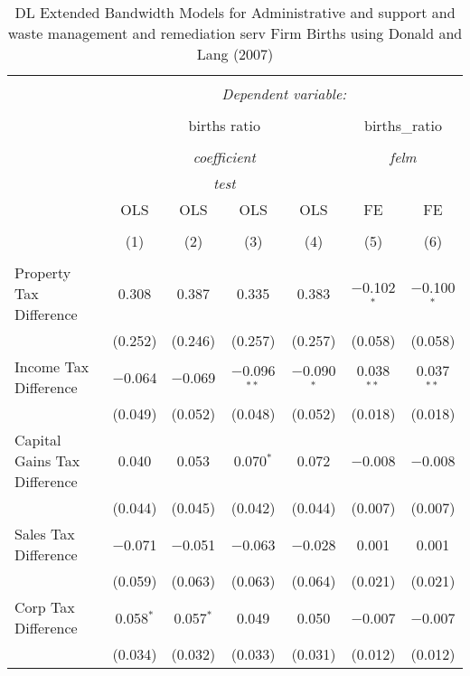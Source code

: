 
\begin{table}[!htbp] \centering 
  \caption{DL Extended Bandwidth Models for  Administrative and support and waste management and remediation serv Firm Births using Donald and Lang (2007)} 
  \label{} 
\begin{tabular}{@{\extracolsep{5pt}}lcccccc} 
\\[-1.8ex]\hline 
\hline \\[-1.8ex] 
 & \multicolumn{6}{c}{\textit{Dependent variable:}} \\ 
\cline{2-7} 
\\[-1.8ex] & \multicolumn{4}{c}{births ratio} & \multicolumn{2}{c}{births\_ratio} \\ 
\\[-1.8ex] & \multicolumn{4}{c}{\textit{coefficient}} & \multicolumn{2}{c}{\textit{felm}} \\ 
 & \multicolumn{4}{c}{\textit{test}} & \multicolumn{2}{c}{\textit{}} \\ 
 & OLS & OLS & OLS & OLS & FE & FE \\ 
\\[-1.8ex] & (1) & (2) & (3) & (4) & (5) & (6)\\ 
\hline \\[-1.8ex] 
 Property Tax Difference & 0.308 & 0.387 & 0.335 & 0.383 & $-$0.102$^{*}$ & $-$0.100$^{*}$ \\ 
  & (0.252) & (0.246) & (0.257) & (0.257) & (0.058) & (0.058) \\ 
  Income Tax Difference & $-$0.064 & $-$0.069 & $-$0.096$^{**}$ & $-$0.090$^{*}$ & 0.038$^{**}$ & 0.037$^{**}$ \\ 
  & (0.049) & (0.052) & (0.048) & (0.052) & (0.018) & (0.018) \\ 
  Capital Gains Tax Difference & 0.040 & 0.053 & 0.070$^{*}$ & 0.072 & $-$0.008 & $-$0.008 \\ 
  & (0.044) & (0.045) & (0.042) & (0.044) & (0.007) & (0.007) \\ 
  Sales Tax Difference & $-$0.071 & $-$0.051 & $-$0.063 & $-$0.028 & 0.001 & 0.001 \\ 
  & (0.059) & (0.063) & (0.063) & (0.064) & (0.021) & (0.021) \\ 
  Corp Tax Difference & 0.058$^{*}$ & 0.057$^{*}$ & 0.049 & 0.050 & $-$0.007 & $-$0.007 \\ 
  & (0.034) & (0.032) & (0.033) & (0.031) & (0.012) & (0.012) \\ 

\end{tabular}
\end{table}
